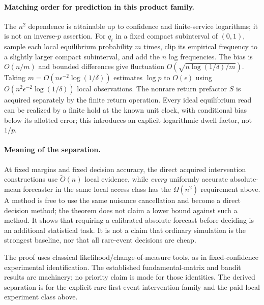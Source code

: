 \paragraph{Matching order for prediction in this product family.}
The $n^2$ dependence is attainable up to confidence and finite-service
logarithms; it is not an inverse-$p$ assertion.  For $q_i$ in a fixed compact
subinterval of $(0,1)$, sample each local equilibrium probability $m$ times,
clip its empirical frequency to a slightly larger compact subinterval,
and add the $n$ log frequencies.  The bias is $O(n/m)$ and bounded
differences give fluctuation
$O(\sqrt{n\log(1/\delta)/m})$.  Taking
$m=O(n\epsilon^{-2}\log(1/\delta))$ estimates $\log p$ to $O(\epsilon)$
using $O(n^2\epsilon^{-2}\log(1/\delta))$ local observations.  The
nonrare return prefactor $S$ is acquired separately by the finite return
operation.  Every ideal equilibrium read can be realized by a finite hold
at the known unit clock, with conditional bias below its allotted error;
this introduces an explicit logarithmic dwell factor, not $1/p$.

\paragraph{Meaning of the separation.}
At fixed margins and fixed decision accuracy, the direct acquired
intervention constructions use $\widetilde O(n)$ local evidence, while
\emph{every} uniformly accurate absolute-mean forecaster in the same local
access class has the $\Omega(n^2)$ requirement above.  A method is free to
use the same nuisance cancellation and become a direct decision method;
the theorem does not claim a lower bound against such a method.  It shows
that requiring a calibrated absolute forecast before deciding is an
additional statistical task.  It is not a claim that ordinary simulation
is the strongest baseline, nor that all rare-event decisions are cheap.

The proof uses classical likelihood/change-of-measure tools, as in
fixed-confidence experimental identification.  The established
fundamental-matrix and bandit results are machinery; no priority claim is
made for those identities.  The derived separation is for the explicit
rare first-event intervention family and the paid local experiment class
above.
